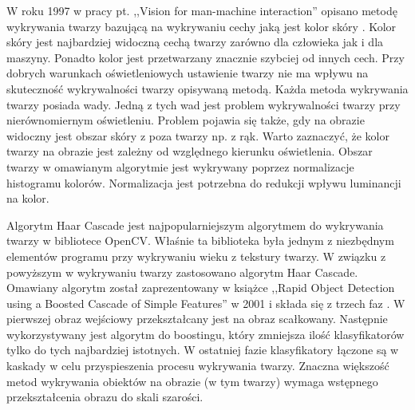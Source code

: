\documentclass[a4paper,twoside,12pt]{book}
\begin{document}
    W roku 1997 w pracy pt. ,,Vision for man-machine interaction'' opisano metodę wykrywania twarzy bazującą na
    wykrywaniu cechy jaką jest kolor skóry \cite{clowleyCoutaz}.
    Kolor skóry jest najbardziej widoczną cechą twarzy zarówno dla człowieka jak i dla maszyny.
    Ponadto kolor jest przetwarzany znacznie szybciej od innych cech.
    Przy dobrych warunkach oświetleniowych ustawienie twarzy nie ma wpływu na skuteczność wykrywalności twarzy
    opisywaną metodą.
    Każda metoda wykrywania twarzy posiada wady.
    Jedną z tych wad jest problem wykrywalności twarzy przy nierównomiernym oświetleniu.
    Problem pojawia się także, gdy na obrazie widoczny jest obszar skóry z poza twarzy np. z rąk.
    Warto zaznaczyć, że kolor twarzy na obrazie jest zależny od względnego kierunku oświetlenia.
    Obszar twarzy w omawianym algorytmie jest wykrywany poprzez normalizacje histogramu kolorów.
    Normalizacja jest potrzebna do redukcji wpływu luminancji na kolor.

    Algorytm Haar Cascade jest najpopularniejszym algorytmem do wykrywania twarzy w bibliotece OpenCV. Właśnie ta
    biblioteka była jednym z niezbędnym elementów programu przy wykrywaniu wieku z tekstury twarzy.
    W związku z powyższym w wykrywaniu twarzy zastosowano algorytm Haar Cascade.
    Omawiany algorytm został zaprezentowany w książce ,,Rapid Object Detection using a Boosted Cascade of Simple
    Features'' w 2001 i składa się z trzech faz \cite{violaJones}.
    W pierwszej obraz wejściowy przekształcany jest na obraz scałkowany.
    Następnie wykorzystywany jest algorytm do boostingu, który zmniejsza ilość klasyfikatorów tylko do tych
    najbardziej istotnych.
    W ostatniej fazie klasyfikatory łączone są w kaskady w celu przyspieszenia procesu wykrywania twarzy.
    Znaczna większość metod wykrywania obiektów na obrazie (w tym twarzy) wymaga wstępnego przekształcenia obrazu do
    skali szarości.

\end{document}
